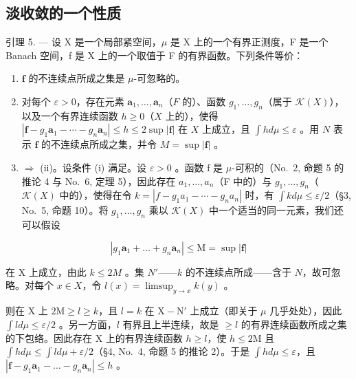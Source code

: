 \subsection{淡收敛的一个性质}

引理 5. --- 设 X 是一个局部紧空间，\(\mu\) 是 X 上的一个有界正测度，F 是一个 Banach 空间，f 是 X 上的一个取值于 F 的有界函数。下列条件等价：

\begin{enumerate}
\def\labelenumi{(\roman{enumi})}
\item
  \(\mathbf{f}\) 的不连续点所成之集是 \(\mu\)-可忽略的。
\item
  对每个 \(\varepsilon > 0\)，存在元素 \(\mathbf{a}_1, \ldots, \mathbf{a}_n\)（\(F\) 的）、函数 \(g_1, \ldots, g_n\)（属于 \(\mathcal{K}(X)\)），以及一个有界连续函数 \(h \geqslant 0\)（\(X\) 上的），使得 \(|\mathbf{f} - g_1 \mathbf{a}_1 - \cdots - g_n \mathbf{a}_n| \leqslant h \leqslant 2 \sup |\mathbf{f}|\) 在 \(X\) 上成立，且 \(\int h d\mu \leqslant \varepsilon\) 。用 \(N\) 表示 \(\mathbf{f}\) 的不连续点所成之集，并令 \(M = \sup |\mathbf{f}|\) 。
\setcounter{enumi}{0}
\item
  \(\Rightarrow\) (ii)。设条件 (i) 满足。设 \(\varepsilon > 0\) 。函数 f 是 \(\mu\)-可积的（No.~2, 命题 5 的推论 4 与 No.~6, 定理 5），因此存在 \(a_{1}, \ldots, a_{n}\)（F 中的）与 \(g_{1}, \ldots, g_{n}\)（\(\mathcal{K}(X)\) 中的），使得在令 \(k = |f - g_{1}a_{1} - \cdots - g_{n}a_{n}|\) 时，有 \(\int k d\mu \leqslant \varepsilon/2\)（§3, No.~5,
命题 10）。将 \(g_1, \ldots, g_n\) 乘以 \(\mathcal{K}(X)\) 中一个适当的同一元素，我们还可以假设
\end{enumerate}

\[
\left| g _ {1} \mathbf {a} _ {1} + \dots + g _ {n} \mathbf {a} _ {n} \right| \leqslant \mathrm{M} = \sup | \mathbf {f} |
\]

在 X 上成立，由此 \(k \leqslant 2M\) 。集 \(N'\)——\(k\) 的不连续点所成——含于 \(N\)，故可忽略。对每个 \(x \in X\)，令 \(l(x) = \limsup_{y \to x} k(y)\) 。

则在 X 上 \(2\mathrm{M} \geqslant l \geqslant k\)，且 \(l = k\) 在 \(\mathrm{X} - \mathrm{N}'\) 上成立（即关于 \(\mu\) 几乎处处），因此 \(\int l d\mu \leqslant \varepsilon / 2\) 。另一方面，\(l\) 有界且上半连续，故是 \(\geqslant l\) 的有界连续函数所成之集的下包络。因此存在 X 上的有界连续函数 \(h \geqslant l\)，使 \(h \leqslant 2\mathrm{M}\) 且 \(\int h d\mu \leqslant \int l d\mu + \varepsilon / 2\)（§4, No.~4, 命题 5 的推论 2）。于是 \(\int h d\mu \leqslant \varepsilon\)，且 \(|\mathbf{f} - g_1\mathbf{a}_1 - \dots - g_n\mathbf{a}_n| \leqslant h\) 。

